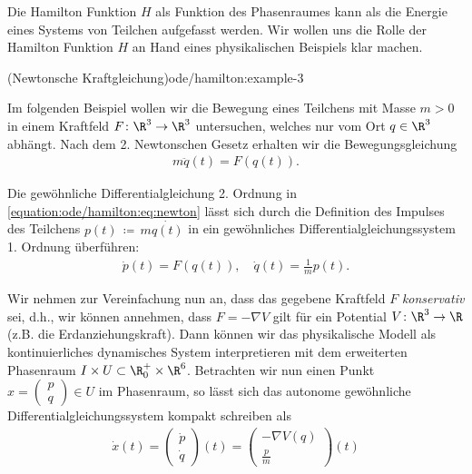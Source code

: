 \documentclass[letterpaper,10pt,german]{jupyterBook}
\begin{document}
\par
Die Hamilton Funktion \(H\) als Funktion des Phasenraumes kann als die Energie eines Systems von Teilchen aufgefasst werden.
Wir wollen uns die Rolle der Hamilton Funktion \(H\) an Hand eines physikalischen Beispiels klar machen.
\begin{example}{(Newtonsche Kraftgleichung)}{ode/hamilton:example-3}



\par
Im folgenden Beispiel wollen wir die Bewegung eines Teilchens mit Masse \(m>0\) in einem Kraftfeld \(F \colon \R^3 \rightarrow \R^3\)  untersuchen, welches nur vom Ort \(q \in \R^3\) abhängt.
Nach dem 2. Newtonschen Gesetz erhalten wir die Bewegungsgleichung
\begin{align}\label{equation:ode/hamilton:eq:newton}
m\ddot{q}(t) = F(q(t)).
\end{align}
\par
Die gewöhnliche Differentialgleichung 2. Ordnung in \eqref{equation:ode/hamilton:eq:newton} lässt sich durch die Definition des Impulses des Teilchens \(p(t) \, \coloneqq \, m \dot{q(t)}\) in ein gewöhnliches Differentialgleichungssystem 1. Ordnung überführen:
\begin{align*}
\dot{p}(t) = F(q(t)), \quad \dot{q}(t) = \frac{1}{m}p(t).
\end{align*}
\par
Wir nehmen zur Vereinfachung nun an, dass das gegebene Kraftfeld \(F\) \emph{konservativ} sei, d.h., wir können annehmen, dass \(F = - \nabla V\) gilt für ein Potential \(V \colon \R^3 \rightarrow \R\) (z.B. die Erdanziehungskraft).
Dann können wir das physikalische Modell als kontinuierliches dynamisches System interpretieren mit dem erweiterten Phasenraum \(I \times U \subset \R^+_0 \times \R^6\).
Betrachten wir nun einen Punkt \(x = \begin{pmatrix} p \\ q\end{pmatrix} \in U\) im Phasenraum, so lässt sich das autonome gewöhnliche Differentialgleichungssystem kompakt schreiben als
\begin{align}\label{equation:ode/hamilton:eq:newton_DGL}
\dot{x}(t) = \begin{pmatrix} \dot{p} \\ \dot{q} \end{pmatrix}(t) = \begin{pmatrix} -\nabla V(q) \\ \frac{p}{m} \end{pmatrix}(t)

\end{align}
\end{example}
\end{document}
